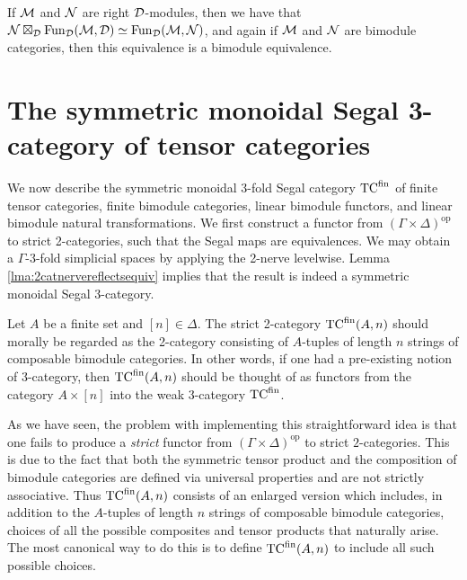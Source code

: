 \documentclass{amsart}
\begin{document}
\begin{remark} \label{remark-tensorasfunctors}
If $\mathcal M$ and $\mathcal N$ are right $\mathcal D$-modules, then we have that $\mathcal N \boxtimes_\mathcal D \operatorname{Fun}_{\mathcal D}(\mathcal M,\mathcal D) \simeq \operatorname{Fun}_{\mathcal D}(\mathcal M,\mathcal N)$, and again if $\mathcal M$ and $\mathcal N$ are bimodule categories, then this equivalence is a bimodule equivalence. 
\end{remark}






\section{The symmetric monoidal Segal 3-category of tensor categories} \label{sec-tc-threecat}

We now describe the symmetric monoidal 3-fold Segal category ${\mathrm{TC}^{\text{fin}}}$ of finite tensor categories, finite bimodule categories, linear bimodule functors, and linear bimodule natural transformations. We first construct a functor from $(\Gamma \times \Delta)^\textrm{op}$ to strict 2-categories, such that the Segal maps are equivalences. We may obtain a $\Gamma$-3-fold simplicial spaces by applying the 2-nerve levelwise. Lemma \ref{lma:2catnervereflectsequiv} implies that the result is indeed a symmetric monoidal  Segal 3-category. 

Let $A$ be a finite set and $[n]\in \Delta$. The strict 2-category ${\mathrm{TC}^{\text{fin}}}(A,n)$ should morally be regarded as the 2-category consisting of $A$-tuples of length $n$ strings of composable bimodule categories. In other words, if one had a pre-existing notion of 3-category, then ${\mathrm{TC}^{\text{fin}}}(A,n)$ should be thought of as functors from the category $A \times [n]$ into the weak 3-category ${\mathrm{TC}^{\text{fin}}}$. 

As we have seen, the problem with implementing this straightforward idea is that one fails to produce a {\em strict} functor from $(\Gamma \times \Delta)^\textrm{op}$ to strict $2$-categories. This is due to the fact that both the symmetric tensor product and the composition of bimodule categories are defined via universal properties and are not strictly associative. Thus ${\mathrm{TC}^{\text{fin}}}(A,n)$ consists of an enlarged version which includes, in addition to the 
$A$-tuples of length $n$ strings of composable bimodule categories, choices of all the possible composites and tensor products that naturally arise. The most canonical way to do this is to define ${\mathrm{TC}^{\text{fin}}}(A,n)$ to include all such possible choices. 


\end{document}
